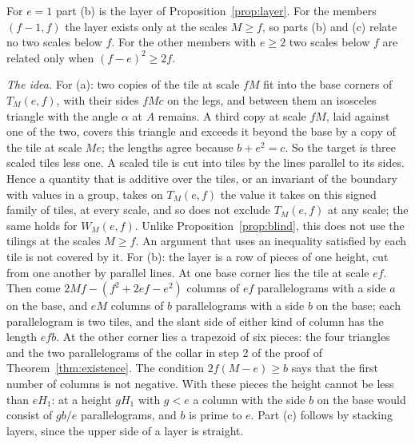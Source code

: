 \documentclass[11pt,reqno]{amsart}
\theoremstyle{plain}
\theoremstyle{definition}
\begin{document}
For $e=1$ part \textup{(b)} is the layer of Proposition~\ref{prop:layer}. For the members $(f-1,f)$ the layer
exists only at the scales $M\ge f$, so parts \textup{(b)} and \textup{(c)} relate no two scales below $f$. For
the other members with $e\ge2$ two scales below $f$ are related only when $(f-e)^2\ge2f$.

\emph{The idea.} For \textup{(a)}: two copies of the tile at scale $fM$ fit into the base corners of
$T_M(e,f)$, with their sides $fMc$ on the legs, and between them an isosceles triangle with the angle $\alpha$
at $A$ remains. A third copy at scale $fM$, laid against one of the two, covers this triangle and exceeds it
beyond the base by a copy of the tile at scale $Me$; the lengths agree because $b+e^2=c$. So the target is
three scaled tiles less one. A scaled tile is cut into tiles by the lines parallel to its sides. Hence a
quantity that is additive over the tiles, or an invariant of the boundary with values in a group, takes on
$T_M(e,f)$ the value it takes on this signed family of tiles, at every scale, and so does not exclude
$T_M(e,f)$ at any scale; the same holds for $W_M(e,f)$. Unlike Proposition~\ref{prop:blind}, this does not
use the tilings at the scales $M\ge f$. An argument that uses an inequality satisfied by each tile is not
covered by it. For \textup{(b)}: the layer
is a row of pieces of one height, cut from one another by parallel lines. At one base corner lies the tile at
scale $ef$. Then come $2Mf-(f^2+2ef-e^2)$ columns of $ef$ parallelograms with a side $a$ on the base, and $eM$
columns of $b$ parallelograms with a side $b$ on the base; each parallelogram is two tiles, and the slant side
of either kind of column has the length $efb$. At the other corner lies a trapezoid of six pieces: the four
triangles and the two parallelograms of the collar in step 2 of the proof of Theorem~\ref{thm:existence}. The
condition $2f(M-e)\ge b$ says that the first number of columns is not negative. With these pieces the height
cannot be less than $eH_1$: at a height $gH_1$ with $g<e$ a column with the side $b$ on the base would consist
of $gb/e$ parallelograms, and $b$ is prime to $e$. Part \textup{(c)} follows by stacking layers, since the
upper side of a layer is straight.
\end{document}
